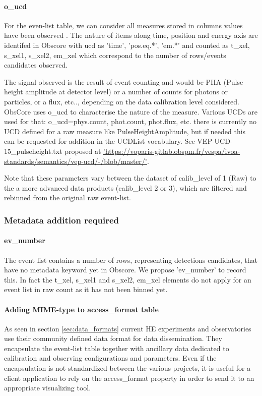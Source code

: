 \documentclass[11pt,a4paper]{ivoa}
\begin{document}
\paragraph{o\_ucd}
For the even-list table, we can consider all measures stored in columns values have been observed .
The nature of items along time, position and energy axis are identifed in Obscore with ucd as 'time', 'pos.eq.*', 'em.*'
and counted as t\_xel, s\_xel1, s\_xel2, em\_xel which correspond to the number of rows/events candidates observed.

The signal observed is the result of event counting and would be PHA (Pulse height amplitude at detector level) or a number of counts for photons or particles, or a flux, etc.., depending on the data calibration level considered.
ObsCore uses o\_ucd to characterise the nature of the measure.
Various UCDs are used for that: o\_ucd=phys.count, phot.count, phot.flux, etc. there is currently no UCD defined for a raw measure like PulseHeightAmplitude, but if needed this can be requested for addition in the UCDList vocabulary. See VEP-UCD-15\_pulseheight.txt proposed at \url{'https://voparis-gitlab.obspm.fr/vespa/ivoa-standards/semantics/vep-ucd/-/blob/master/'}.

Note that these parameters vary between the dataset of calib\_level of 1 (Raw) to the a more advanced data products (calib\_level 2 or 3), which are filtered and rebinned from the original raw event-list.


\subsubsection{Metadata addition required}

\paragraph{ev\_number}
The event list contains a number of rows, representing detections candidates, that have no metadata keyword yet in Obscore.
We propose 'ev\_number' to record this.
In fact the t\_xel, s\_xel1 and s\_xel2, em\_xel elements do not apply for an event list in raw count as it has not been binned yet.

\paragraph{Adding MIME-type to access\_format table}
As seen in section \ref{sec:data_formats} current HE experiments and observatories use their community defined data format for data dissemination.
They encapsulate the event-list table together with ancillary data dedicated to calibration and observing configurations and parameters.
Even if the encapsulation is not standardized between the various projects, it is useful for a client application to rely on the access\_format property in order to send it to an appropriate visualizing tool.
\end{document}
